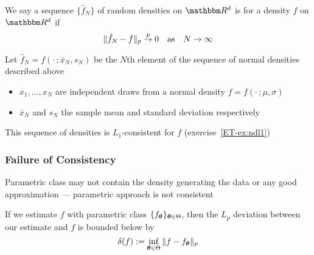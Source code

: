 \begin{frame}
    
    \vspace{2em}
    We say a sequence $\{\hat f_N\}$ of random
    densities  on $\RR^d$ is  for a density $f$ on $\RR^d$
    if 
    \begin{equation*}
        \| \hat f_N - f \|_p \stackrel { p } {\to} 0
        \quad \text{as} \quad
        N \to \infty
    \end{equation*}
    
    \vspace{.7em}
    \Eg
        Let $\hat f_N = f(\cdot \,; \bar x_N, s_N)$ be the $N$th element of the
        sequence of normal densities described above
        \begin{itemize}
            \item $x_1, \ldots, x_N$ are
        independent draws from a normal density $f = f(\cdot \,; \mu, \sigma)$
            \item $\bar x_N$ and $s_N$ the sample mean and standard deviation respectively
        \end{itemize}
        
        This sequence of densities is $L_1$-consistent for $f$ (exercise~\ref{ET-ex:ndl1})
        
\end{frame}

\begin{frame}\frametitle{Failure of Consistency}

    \vspace{2em}
    Parametric class may not contain the density generating
    the data or any good approximation --- parametric
        approach is  not consistent

    \vspace{.7em}
    If we estimate $f$ with
    parametric class $\{f_{{\boldsymbol \theta}}\}_{{\boldsymbol \theta} \in \Theta}$, then the $L_p$
    deviation between our estimate and $f$ is bounded below by
    \begin{equation}
        \label{eq:xi}
        \delta(f) := \inf_{{\boldsymbol \theta} \in \Theta} \| f - f_{{\boldsymbol \theta}} \|_p
    \end{equation}
    
\end{frame}

